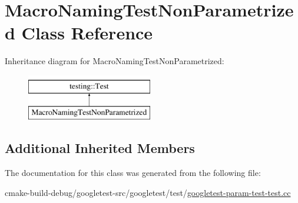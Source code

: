 \hypertarget{classMacroNamingTestNonParametrized}{}\section{Macro\+Naming\+Test\+Non\+Parametrized Class Reference}
\label{classMacroNamingTestNonParametrized}
Inheritance diagram for Macro\+Naming\+Test\+Non\+Parametrized\+:\begin{figure}[H]
\begin{center}
\leavevmode
\includegraphics[height=2.000000cm]{classMacroNamingTestNonParametrized}
\end{center}
\end{figure}
\subsection*{Additional Inherited Members}


The documentation for this class was generated from the following file\+:\begin{DoxyCompactItemize}
\item 
cmake-\/build-\/debug/googletest-\/src/googletest/test/\mbox{\hyperlink{googletest-param-test-test_8cc}{googletest-\/param-\/test-\/test.\+cc}}\end{DoxyCompactItemize}
